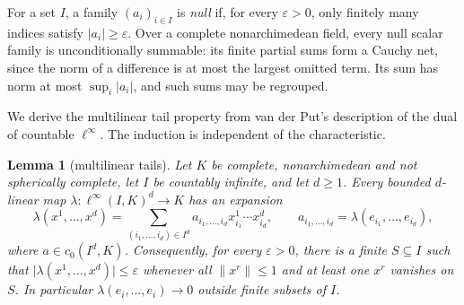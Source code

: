 \documentclass[11pt]{amsart}
\newtheorem{lemma}[theorem]{Lemma}
\theoremstyle{definition}
\theoremstyle{remark}
\numberwithin{equation}{section}
\newcommand{\linf}{\ell^\infty}
\newcommand{\abs}[1]{\lvert #1\rvert}
\newcommand{\norm}[1]{\lVert #1\rVert}
\begin{document}
For a set $I$, a family $(a_i)_{i\in I}$ is \emph{null} if, for every $\varepsilon>0$, only finitely many
indices satisfy $\abs{a_i}\ge\varepsilon$. Over a complete nonarchimedean field, every null scalar family
is unconditionally summable: its finite partial sums form a Cauchy net, since the norm of a difference is
at most the largest omitted term. Its sum has norm at most $\sup_i\abs{a_i}$, and such sums may be regrouped.

We derive the multilinear tail property from van der Put's description of the dual of countable $\linf$. The induction is independent of the characteristic.

\begin{lemma}[multilinear tails]\label{scalar:tail}
Let $K$ be complete, nonarchimedean and not spherically complete, let $I$ be countably infinite, and let
$d\ge1$. Every bounded $d$\nobreakdash-linear map $\lambda\colon\linf(I,K)^d\to K$ has an expansion
\begin{equation}\label{scalar:array}
 \lambda(x^1,\dots,x^d)
 =\sum_{(i_1,\dots,i_d)\in I^d}a_{i_1,\dots,i_d}x^1_{i_1}\cdots x^d_{i_d},
 \qquad a_{i_1,\dots,i_d}=\lambda(e_{i_1},\dots,e_{i_d}),
\end{equation}
where $a\in c_0(I^d,K)$. Consequently, for every $\varepsilon>0$, there is a finite $S\subseteq I$ such that
$\abs{\lambda(x^1,\dots,x^d)}\le\varepsilon$ whenever all $\norm{x^r}\le1$ and at least one $x^r$ vanishes
on $S$. In particular $\lambda(e_i,\dots,e_i)\to0$ outside finite subsets of $I$.
\end{lemma}
\end{document}
